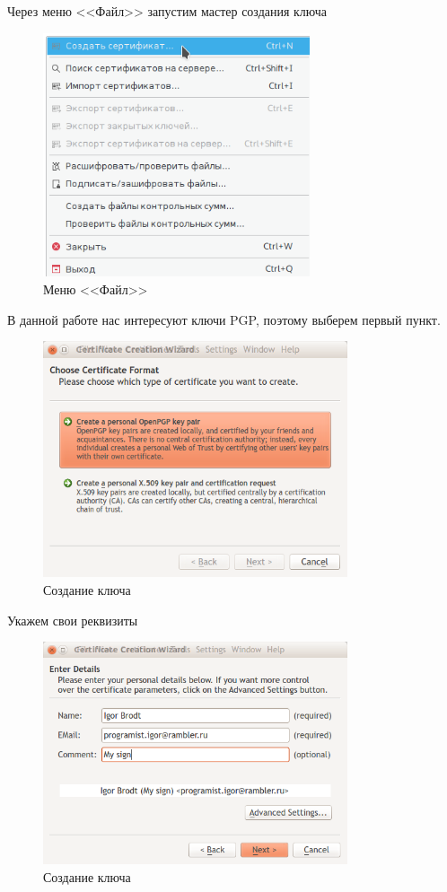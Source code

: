 Через меню <<Файл>> запустим мастер создания ключа

\begin{figure}[H]
	\centering
	\includegraphics[width=0.7\textwidth]{images/0.png}
	\caption{Меню <<Файл>>}
\end{figure}

В данной работе нас интересуют ключи PGP, поэтому выберем первый пункт.

\begin{figure}[H]
	\centering
	\includegraphics[width=0.8\textwidth]{images/2.png}
	\caption{Создание ключа}
\end{figure}

Укажем свои реквизиты

\begin{figure}[H]
	\centering
	\includegraphics[width=0.8\textwidth]{images/3.png}
	\caption{Создание ключа}
\end{figure}

